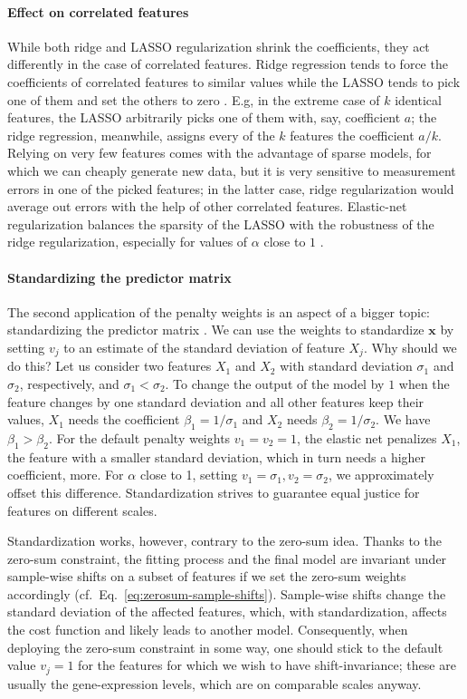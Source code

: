 \paragraph{Effect on correlated features}
While both ridge and LASSO regularization shrink the coefficients, they act differently in the case 
of correlated features. Ridge regression tends to force the coefficients of correlated features to 
similar values while the LASSO tends to pick one of them and set the others to zero 
\cite{elasticnet05}. E.g, in the
extreme case of $k$ identical features, the LASSO arbitrarily picks one of them with, say, 
coefficient $a$; the ridge regression, meanwhile, assigns every of the $k$ features the coefficient 
$a/k$. Relying on very few features comes with the advantage of sparse models, for which we 
can cheaply generate new data, but it is very sensitive to measurement errors in one of the picked 
features; in the latter case, ridge regularization would average out errors with the help of other 
correlated features. Elastic-net regularization balances the sparsity of the LASSO with the 
robustness of the ridge regularization, especially for values of $\alpha$ close to $1$ 
\cite{regularization-path10}.

\paragraph{Standardizing the predictor matrix} 
The second application of the penalty weights is an aspect of a bigger topic: standardizing the
predictor matrix \cite{elem-stat-learn01}. We can use the weights to standardize $\mathbf{x}$ by 
setting $v_j$ to an estimate of the standard deviation of feature $X_j$. Why 
should we do this? Let us consider two features $X_1$ and $X_2$ with standard deviation $\sigma_1$
and $\sigma_2$, respectively, and $\sigma_1 < \sigma_2$. To change the output of the model by $1$ 
when the feature changes by 
one standard deviation and all other features keep their values, $X_1$ needs the coefficient 
$\beta_1 = 1/\sigma_1$ and $X_2$ needs $\beta_2 = 1/\sigma_2$. We have $\beta_1 > \beta_2$. For 
the default penalty weights $v_1 = v_2 = 1$, the elastic net penalizes $X_1$, the feature with a smaller 
standard deviation, which in turn needs a higher coefficient, more. For $\alpha$ close to 
\num{1}, setting $v_1 = \sigma_1, v_2 = \sigma_2$, we approximately offset this difference.
Standardization strives to guarantee equal justice for features 
on different scales. 

Standardization works, however, contrary to the zero-sum idea. Thanks to the 
zero-sum constraint, the fitting process and the final model are invariant under sample-wise 
shifts on a subset of features if we set the zero-sum weights accordingly (cf.\ Eq.\ 
\eqref{eq:zerosum-sample-shifts}). Sample-wise shifts 
change the standard deviation of the affected features, which, with standardization,
affects the cost function and likely leads to another model. 
Consequently, when deploying the zero-sum constraint in some way, one should stick to the default 
value $v_j = 1$ for the features for which we wish to have shift-invariance; these are usually the 
gene-expression levels, which are on comparable scales anyway.

